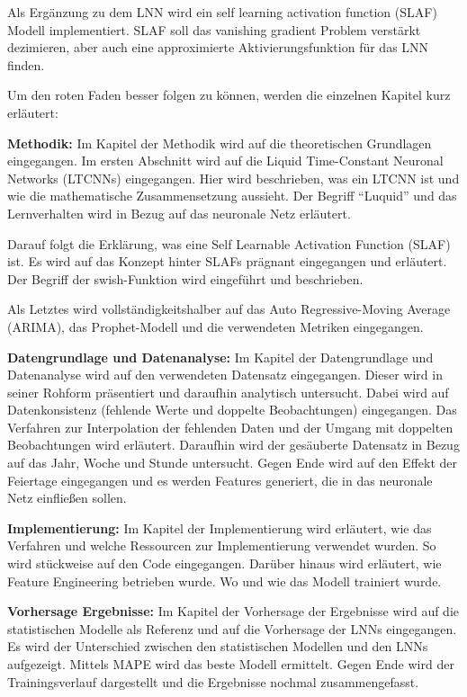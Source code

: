 \documentclass[11pt,ngerman,a4paper,]{article}
\begin{document}
Als Ergänzung zu dem LNN wird ein self learning activation function (SLAF) Modell implementiert. SLAF soll das vanishing gradient Problem verstärkt dezimieren, aber auch eine approximierte Aktivierungsfunktion für das LNN finden.

Um den roten Faden besser folgen zu können, werden die einzelnen Kapitel kurz erläutert:

\textbf{Methodik:} Im Kapitel der Methodik wird auf die theoretischen Grundlagen eingegangen. Im ersten Abschnitt wird auf die Liquid Time-Constant Neuronal Networks (LTCNNs) eingegangen. Hier wird beschrieben, was ein LTCNN ist und wie die mathematische Zusammensetzung aussieht. Der Begriff ``Luquid'' und das Lernverhalten wird in Bezug auf das neuronale Netz erläutert.

Darauf folgt die Erklärung, was eine Self Learnable Activation Function (SLAF) ist. Es wird auf das Konzept hinter SLAFs prägnant eingegangen und erläutert. Der Begriff der swish-Funktion wird eingeführt und beschrieben.

Als Letztes wird vollständigkeitshalber auf das Auto Regressive-Moving Average (ARIMA), das Prophet-Modell und die verwendeten Metriken eingegangen.

\textbf{Datengrundlage und Datenanalyse:} Im Kapitel der Datengrundlage und Datenanalyse wird auf den verwendeten Datensatz eingegangen. Dieser wird in seiner Rohform präsentiert und daraufhin analytisch untersucht. Dabei wird auf Datenkonsistenz (fehlende Werte und doppelte Beobachtungen) eingegangen. Das Verfahren zur Interpolation der fehlenden Daten und der Umgang mit doppelten Beobachtungen wird erläutert. Daraufhin wird der gesäuberte Datensatz in Bezug auf das Jahr, Woche und Stunde untersucht. Gegen Ende wird auf den Effekt der Feiertage eingegangen und es werden Features generiert, die in das neuronale Netz einfließen sollen.

\textbf{Implementierung:} Im Kapitel der Implementierung wird erläutert, wie das Verfahren und welche Ressourcen zur Implementierung verwendet wurden. So wird stückweise auf den Code eingegangen. Darüber hinaus wird erläutert, wie Feature Engineering betrieben wurde. Wo und wie das Modell trainiert wurde.

\textbf{Vorhersage Ergebnisse:} Im Kapitel der Vorhersage der Ergebnisse wird auf die statistischen Modelle als Referenz und auf die Vorhersage der LNNs eingegangen. Es wird der Unterschied zwischen den statistischen Modellen und den LNNs aufgezeigt. Mittels MAPE wird das beste Modell ermittelt. Gegen Ende wird der Trainingsverlauf dargestellt und die Ergebnisse nochmal zusammengefasst.
\end{document}
